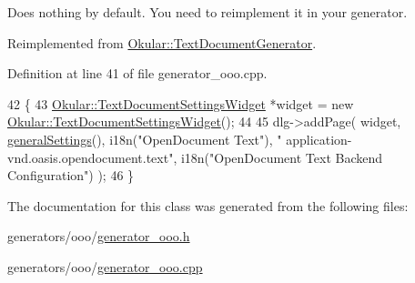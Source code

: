 Does nothing by default. You need to reimplement it in your generator. 



Reimplemented from \hyperlink{classOkular_1_1TextDocumentGenerator_acc42fa387044ecf9f26bc1b4952ad6d3}{Okular\+::\+Text\+Document\+Generator}.



Definition at line 41 of file generator\+\_\+ooo.\+cpp.


\begin{DoxyCode}
42 \{
43     \hyperlink{classOkular_1_1TextDocumentSettingsWidget}{Okular::TextDocumentSettingsWidget} *widget = \textcolor{keyword}{new} 
      \hyperlink{classOkular_1_1TextDocumentSettingsWidget}{Okular::TextDocumentSettingsWidget}();
44 
45     dlg->addPage( widget, \hyperlink{classOkular_1_1TextDocumentGenerator_a776f1b9f38f55fdf086e022388ee4e36}{generalSettings}(), i18n(\textcolor{stringliteral}{"OpenDocument Text"}), \textcolor{stringliteral}{"
      application-vnd.oasis.opendocument.text"}, i18n(\textcolor{stringliteral}{"OpenDocument Text Backend Configuration"}) );
46 \}
\end{DoxyCode}


The documentation for this class was generated from the following files\+:\begin{DoxyCompactItemize}
\item 
generators/ooo/\hyperlink{generator__ooo_8h}{generator\+\_\+ooo.\+h}\item 
generators/ooo/\hyperlink{generator__ooo_8cpp}{generator\+\_\+ooo.\+cpp}\end{DoxyCompactItemize}
